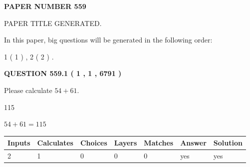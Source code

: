 \documentclass[12pt]{article}
\begin{document}
   
 {\textbf{ \Large{ PAPER NUMBER  559  }}}
   
   
\vspace{0.2in}
   
   
   
   
   
   
   
   
 \vspace{0.2in}
 
 
 
 
   
   
 PAPER TITLE GENERATED.
   
   
   
\vspace{0.2in}
   
In this paper, big questions will be generated in the following order: 
   
   
   1 ( 1 )
 ,
   2 ( 2 )
 .
  
\vspace{0.2in}
  
{\textbf{\Large{QUESTION
559.1 
 ( 1 , 1 , 6791 )
}}}
  
  
 
Please calculate $ %
54 +  %
61 $.
 
 
 
\noindent{}
 
 

115
 
 
\noindent{}
 
 

 
 
 
\noindent{}
 
 

$ %
54 +  %
61=   %
115$
 
 
\noindent{}
 
 

 
   
   
   
   
\noindent\begin{tabular}{|l|l|l|l|l|l|l|}
 \hline
Inputs & Calculates & Choices & Layers & Matches & Answer & Solution \\ \hline
 2  & 
 1  & 
 0
  & 
 0  & 
 0  & 
  yes & 
  yes 
  \\ \hline
 \end{tabular}
   
\end{document}
